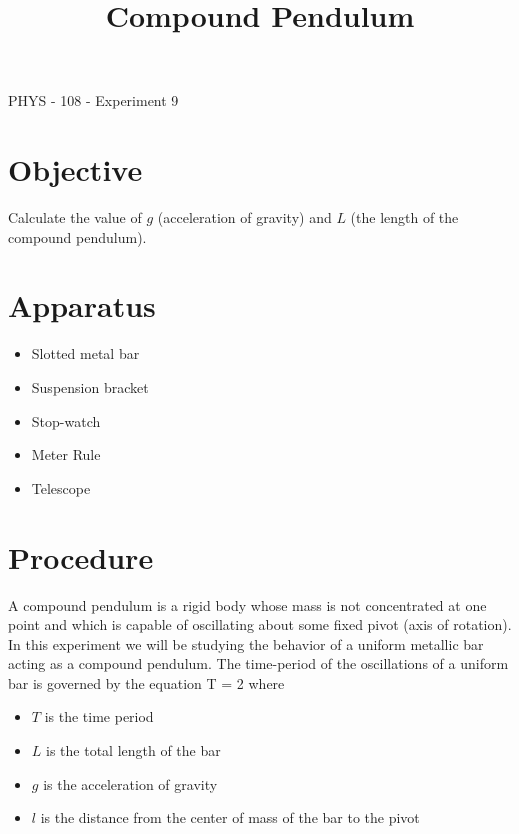 \documentclass{article}
\title{Compound Pendulum}
\begin{document}
   {\hfill PHYS - 108 - Experiment 9}\\
   \maketitle

   \section*{Objective}
   
      Calculate the value of $g$ (acceleration of gravity) and $L$ (the length of the compound pendulum).


   \section*{Apparatus}

      \begin{itemize}

         \item Slotted metal bar
         \item Suspension bracket
         \item Stop-watch
         \item Meter Rule
         \item Telescope

      \end{itemize}


   \section*{Procedure}

      A compound pendulum is a rigid body whose mass is not concentrated at one point and which is capable of oscillating about some fixed pivot (axis of rotation). In this experiment we will be studying the behavior of a uniform metallic bar acting as a compound pendulum. The time-period of the oscillations of a uniform bar is governed by the equation
      \beq \label{eqn_T}
         T = 2 \pi {}
      \eeq
      where
      \begin{itemize}
         \item $T$ is the time period
         \item $L$ is the total length of the bar
         \item $g$ is the acceleration of gravity
         \item $l$ is the distance from the center of mass of the bar to the pivot
      \end{itemize}
\end{document}
